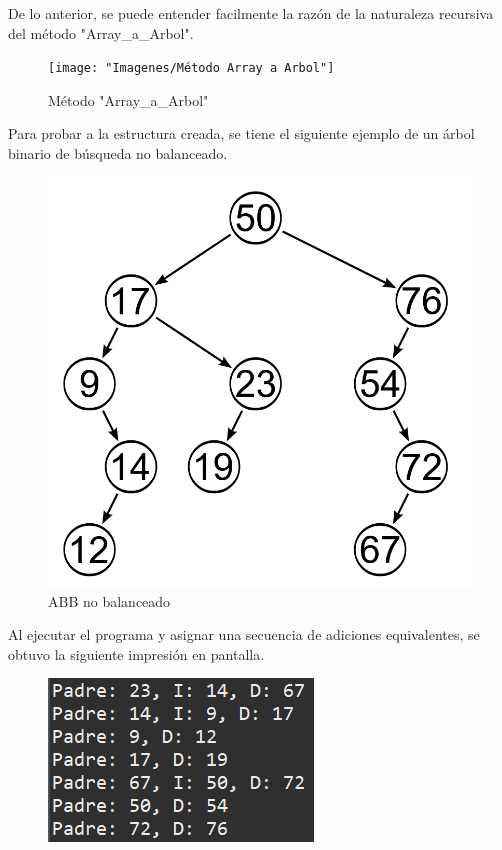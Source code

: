 \documentclass[letterpaper, 11pt]{article}
\begin{document}
	 De lo anterior, se puede entender facilmente la razón de la naturaleza recursiva del método "Array\_a\_Arbol".
	 
	 \begin{figure}[H]
	 	\centering
	 	\texttt{[image: "Imagenes/Método Array a Arbol"]}
	 	\caption{Método "Array\_a\_Arbol"}
	 \end{figure}
	 
	Para probar a la estructura creada, se tiene el siguiente ejemplo de un árbol binario de búsqueda no balanceado.
	
	\begin{figure}[H]
		\centering
		\includegraphics[scale=0.3]{"Imagenes/ABB no balanceado"}
		\caption{ABB no balanceado}
	\end{figure}
	
	Al ejecutar el programa y asignar una secuencia de adiciones equivalentes, se obtuvo la siguiente impresión en pantalla.
	
	\begin{figure}[H]
		\centering
		\includegraphics[scale=0.5]{"Imagenes/ABB balanceado 1"}
		\caption{}
		\label{fig:abb-balanceado-1}
	\end{figure}
	
\end{document}
